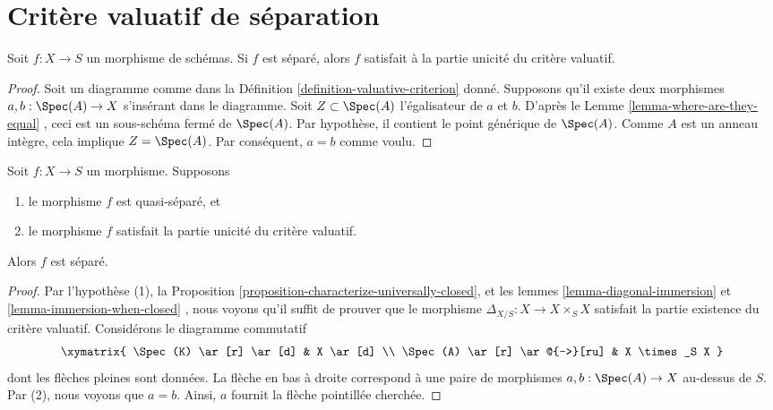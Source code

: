 \section{Critère valuatif de séparation}
\label{section-valuative-separatedness}

\begin{lemma}
\label{lemma-separated-implies-valuative}
Soit  $f : X \to S$  un morphisme de schémas. Si  $f$  est séparé, alors
 $f$  satisfait à la partie unicité du critère valuatif.
\end{lemma}

\begin{proof}
Soit un diagramme comme dans la Définition  \ref{definition-valuative-criterion}  donné. Supposons qu'il
existe deux morphismes  $a, b : \Spec(A) \to X$  s'insérant dans le diagramme. Soit
 $Z \subset \Spec(A)$  l'égalisateur de  $a$  et  $b$. D'après le Lemme
 \ref{lemma-where-are-they-equal} , ceci est un sous-schéma fermé de  $\Spec(A)$. Par hypothèse, il
contient le point générique de  $\Spec(A)$. Comme  $A$  est un anneau intègre,
cela implique  $Z = \Spec(A)$. Par conséquent,  $a = b$  comme voulu.
\end{proof}

\begin{lemma}
\label{lemma-valuative-criterion-separatedness}
\begin{reference}
\cite[II Proposition 7.2.3]{EGA}
\end{reference}
Soit  $f : X \to S$  un morphisme. Supposons
\begin{enumerate}
\item le morphisme  $f$  est quasi-séparé, et
\item le morphisme  $f$  satisfait la partie unicité du critère valuatif.
\end{enumerate}
Alors  $f$  est séparé.
\end{lemma}

\begin{proof}
Par l'hypothèse (1), la Proposition  \ref{proposition-characterize-universally-closed}, et les lemmes  \ref{lemma-diagonal-immersion}  et
 \ref{lemma-immersion-when-closed} , nous voyons qu'il suffit de prouver que le morphisme  $\Delta_{X/S} : X \to X \times_S X$ 
satisfait la partie existence du critère valuatif. Considérons le diagramme commutatif
$$
\xymatrix{
\Spec(K) \ar[r] \ar[d] & X \ar[d] \\
\Spec(A) \ar[r] \ar@{-->}[ru] & X \times_S X
}
$$
dont les flèches pleines sont données. La flèche en bas à droite correspond à une paire de morphismes  $a, b : \Spec(A) \to X$ 
au-dessus de  $S$. Par (2), nous voyons que  $a = b$. Ainsi,
 $a$  fournit la flèche pointillée cherchée.
\end{proof}





